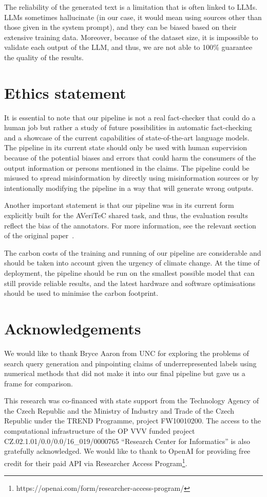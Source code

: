 \documentclass[11pt]{article}
\newcommand{\averitec}{AVeriTeC}
\begin{document}
The reliability of the generated text is a limitation that is often linked to LLMs. LLMs sometimes hallucinate (in our case, it would mean using sources other than those given in the system prompt), and they can be biased based on their extensive training data. Moreover, because of the dataset size, it is impossible to validate each output of the LLM, and thus, we are not able to 100\% guarantee the quality of the results.

\section*{Ethics statement}
It is essential to note that our pipeline is not a real fact-checker that could do a human job but rather a study of future possibilities in automatic fact-checking and a showcase of the current capabilities of state-of-the-art language models. The pipeline in its current state should only be used with human supervision because of the potential biases and errors that could harm the consumers of the output information or persons mentioned in the claims. The pipeline could be misused to spread misinformation by directly using misinformation sources or by intentionally modifying the pipeline in a way that will generate wrong outputs.

Another important statement is that our pipeline was in its current form explicitly built for the \averitec{} shared task, and thus, the evaluation results reflect the bias of the annotators. For more information, see the relevant section of the original paper~\cite{averitec2024}.

The carbon costs of the training and running of our pipeline are considerable and should be taken into account given the urgency of climate change. At the time of deployment, the pipeline should be run on the smallest possible model that can still provide reliable results, and the latest hardware and software optimisations should be used to minimise the carbon footprint.

\section*{Acknowledgements}
We would like to thank Bryce Aaron from UNC for exploring the problems of search query generation and pinpointing claims of underrepresented labels using numerical methods that did not make it into our final pipeline but gave us a frame for comparison. 

This research was co-financed with state support from the Technology Agency of the Czech Republic and the Ministry of Industry and Trade of the Czech Republic under the TREND Programme, project FW10010200.
The access to the computational infrastructure of the OP VVV funded project CZ.02.1.01/0.0/0.0/16\_019/0000765 ``Research Center for Informatics'' is also gratefully acknowledged.
We would like to thank to \mbox{OpenAI} for providing free credit for their paid API via Researcher Access Program\footnote{https://openai.com/form/researcher-access-program/}.






\appendix


%

\end{document}
